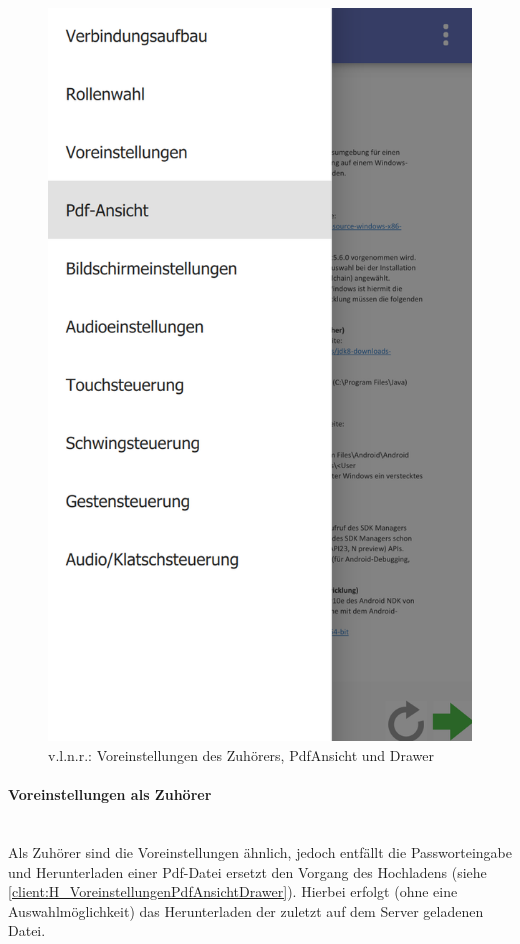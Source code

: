 \begin{figure}[ht!]
\begin{minipage}{0.31\linewidth}
		\includegraphics[scale=0.5]{GUI/Bilder/6_Menu-Button_Drawer_mit_Listview.PNG}
	\end{minipage}
	\caption{v.l.n.r.: Voreinstellungen des Zuhörers, PdfAnsicht und Drawer{\tiny}}
	\label{client:H_VoreinstellungenPdfAnsichtDrawer}
\end{figure}

\newpage

\paragraph{Voreinstellungen als Zuhörer}$\;$\\
Als Zuhörer sind die Voreinstellungen ähnlich, jedoch entfällt die Passworteingabe und Herunterladen einer Pdf-Datei ersetzt den Vorgang des Hochladens (siehe \autoref{client:H_VoreinstellungenPdfAnsichtDrawer}). Hierbei erfolgt (ohne eine Auswahlmöglichkeit) das Herunterladen der zuletzt auf dem Server geladenen Datei.
